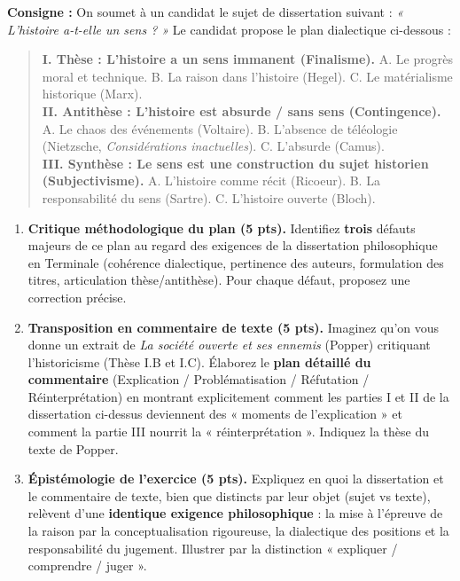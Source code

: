 \documentclass[11pt]{article}
\begin{document}
\begin{exercice}
\textbf{Consigne :} On soumet à un candidat le sujet de dissertation suivant : \textit{« L'histoire a-t-elle un sens ? »} Le candidat propose le plan dialectique ci-dessous :
\begin{quote}
    \textbf{I. Thèse : L'histoire a un sens immanent (Finalisme).} A. Le progrès moral et technique. B. La raison dans l'histoire (Hegel). C. Le matérialisme historique (Marx). \\
    \textbf{II. Antithèse : L'histoire est absurde / sans sens (Contingence).} A. Le chaos des événements (Voltaire). B. L'absence de téléologie (Nietzsche, \textit{Considérations inactuelles}). C. L'absurde (Camus). \\
    \textbf{III. Synthèse : Le sens est une construction du sujet historien (Subjectivisme).} A. L'histoire comme récit (Ricoeur). B. La responsabilité du sens (Sartre). C. L'histoire ouverte (Bloch).
\end{quote}

\begin{enumerate}
    \item \textbf{Critique méthodologique du plan (5 pts).} Identifiez \textbf{trois} défauts majeurs de ce plan au regard des exigences de la dissertation philosophique en Terminale (cohérence dialectique, pertinence des auteurs, formulation des titres, articulation thèse/antithèse). Pour chaque défaut, proposez une correction précise.
    \item \textbf{Transposition en commentaire de texte (5 pts).} Imaginez qu'on vous donne un extrait de \textit{La société ouverte et ses ennemis} (Popper) critiquant l'historicisme (Thèse I.B et I.C). Élaborez le \textbf{plan détaillé du commentaire} (Explication / Problématisation / Réfutation / Réinterprétation) en montrant explicitement comment les parties I et II de la dissertation ci-dessus deviennent des « moments de l'explication » et comment la partie III nourrit la « réinterprétation ». Indiquez la thèse du texte de Popper.
    \item \textbf{Épistémologie de l'exercice (5 pts).} Expliquez en quoi la dissertation et le commentaire de texte, bien que distincts par leur objet (sujet vs texte), relèvent d'une \textbf{identique exigence philosophique} : la mise à l'épreuve de la raison par la conceptualisation rigoureuse, la dialectique des positions et la responsabilité du jugement. Illustrer par la distinction « expliquer / comprendre / juger ».
\end{enumerate}
\end{exercice}
\end{document}
